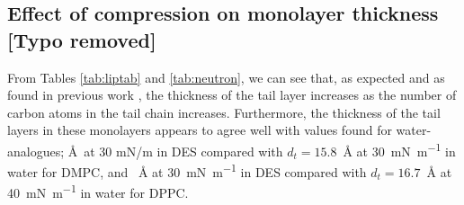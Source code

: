 \documentclass[amsmath,amssymb,twocolumn,superscriptaddress]{revtex4-1}
\begin{document}
\subsection{Effect of compression on monolayer thickness [Typo removed]}
%
From Tables \ref{tab:liptab} and \ref{tab:neutron}, we can see that, as expected and as found in previous work \cite{mohwald_phospholipid_1990,vaknin_structural_1991}, the thickness of the tail layer increases as the number of carbon atoms in the tail chain increases.
Furthermore, the thickness of the tail layers in these monolayers appears to agree well with values found for water-analogues; \AA\ at 30 mN/m in DES compared with $d_t=15.8$~\si{\angstrom} at \SI{30}{\milli\newton\per\meter} \cite{johnson_structure_1991} in water for DMPC, and ~\si{\angstrom} at \SI{30}{\milli\newton\per\meter} in DES compared with $d_t=16.7$~\si{\angstrom} at \SI{40}{\milli\newton\per\meter} \cite{helm_phospholipid_1987} in water for DPPC.
\end{document}
